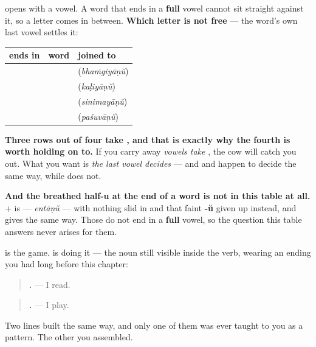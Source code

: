\begin{grammarlens}[title={Grammar Lens: the vowel at the end chooses}]
\textbf{} opens with a vowel. A word that ends in a \textbf{full} vowel cannot sit straight against it, so a letter comes in between. \textbf{Which letter is not free} — the word's own last vowel settles it:

\noindent
\begin{tabularx}{\linewidth}{@{}>{\raggedright\arraybackslash}X>{\raggedright\arraybackslash}X>{\raggedright\arraybackslash}X@{}}
\toprule
\textbf{ends in} & \textbf{word} & \textbf{joined to \textbf{\ml{ആണ്}}} \\
\midrule
\textbf{\ml{ഇ}} & \textbf{\ml{ഭംഗി}} & \textbf{\ml{ഭംഗിയാണ്}} (\emph{bhaṁgiyāṇŭ}) \\
\textbf{\ml{ഇ}} & \textbf{\ml{കളി}} & \textbf{\ml{കളിയാണ്}} (\emph{kaḷiyāṇŭ}) \\
\textbf{\ml{അ}} & \textbf{\ml{സിനിമ}} & \textbf{\ml{സിനിമയാണ്}} (\emph{sinimayāṇŭ}) \\
\textbf{\ml{ഉ}} & \textbf{\ml{പശു}} & \textbf{\ml{പശുവാണ്}} (\emph{paśuvāṇŭ}) \\
\bottomrule
\end{tabularx}

\textbf{Three rows out of four take , and that is exactly why the fourth is worth holding on to.} If you carry away \emph{vowels take }, the cow will catch you out. What you want is \emph{the last vowel decides} — and \textbf{} and \textbf{} happen to decide the same way, while \textbf{} does not.

\textbf{And the breathed half-u at the end of a word is not in this table at all.} \textbf{} + \textbf{} is \textbf{} — \emph{entāṇŭ} — with nothing slid in and that faint \textbf{-ŭ} given up instead, and \textbf{} gives \textbf{} the same way. Those do not end in a \textbf{full} vowel, so the question this table answers never arises for them.
\end{grammarlens}

\begin{grammarlens}[title={What you've built}]
\textbf{} is the game. \textbf{} is doing it — the noun still visible inside the verb, wearing an ending you had long before this chapter:

\begin{quote}
\textbf{ .} — I read.
\end{quote}

\begin{quote}
\textbf{ .} — I play.
\end{quote}

Two lines built the same way, and only one of them was ever taught to you as a pattern. The other you assembled.
\end{grammarlens}

